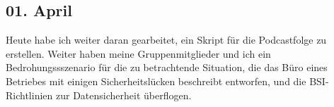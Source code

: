 \subsection{01. April}
Heute habe ich weiter daran gearbeitet, ein Skript für die Podcastfolge zu erstellen. Weiter haben meine Gruppenmitglieder und ich ein Bedrohungssszenario für die zu betrachtende Situation, die das Büro eines Betriebes mit einigen Sicherheitslücken beschreibt entworfen, und die BSI-Richtlinien zur Datensicherheit überflogen.